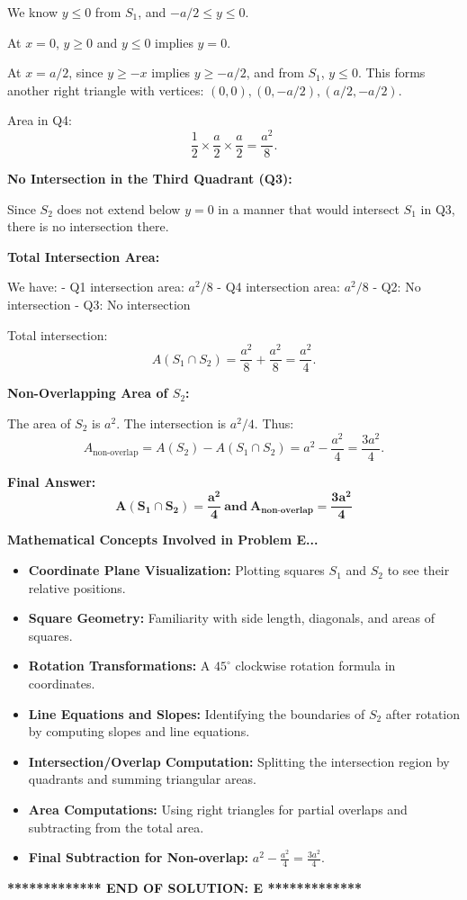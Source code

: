 \documentclass[12pt,a4paper]{article}
\begin{document}
We know \( y \le 0 \) from \( S_1 \), and \(-a/2 \le y \le 0\).

At \( x=0 \), \( y \ge 0 \) and \( y\le 0 \) implies \( y=0 \).

At \( x=a/2 \), since \( y\ge -x \) implies \( y\ge -a/2 \), and from \( S_1 \), \( y \le 0 \). This forms another right triangle with vertices:
\((0,0), (0,-a/2), (a/2,-a/2)\).

Area in Q4:
\[
\frac{1}{2}\times\frac{a}{2}\times\frac{a}{2} = \frac{a^2}{8}.
\]

\medskip

\noindent\textbf{No Intersection in the Third Quadrant (Q3):}

Since \( S_2 \) does not extend below \( y=0 \) in a manner that would intersect \( S_1 \) in Q3, there is no intersection there.

\medskip

\noindent\textbf{Total Intersection Area:}

We have:
- Q1 intersection area: \( a^2/8 \)
- Q4 intersection area: \( a^2/8 \)
- Q2: No intersection
- Q3: No intersection

Total intersection:
\[
A(S_1 \cap S_2) = \frac{a^2}{8} + \frac{a^2}{8} = \frac{a^2}{4}.
\]

\medskip

\noindent\textbf{Non-Overlapping Area of \( S_2 \):}

The area of \( S_2 \) is \( a^2 \). The intersection is \( a^2/4 \). Thus:
\[
A_{\text{non-overlap}} = A(S_2) - A(S_1 \cap S_2) = a^2 - \frac{a^2}{4} = \frac{3a^2}{4}.
\]

\medskip

\noindent\textbf{Final Answer:}
\[
\boxed{\mathbf{A(S_1 \cap S_2) = \frac{a^2}{4}\ \text{and}\ A_{\text{non-overlap}} = \frac{3a^2}{4}}}
\]

\bigskip

\noindent\textbf{Mathematical Concepts Involved in Problem E...}
\begin{itemize}
\item \textbf{Coordinate Plane Visualization:} Plotting squares $S_1$ and $S_2$ to see their relative positions.
\item \textbf{Square Geometry:} Familiarity with side length, diagonals, and areas of squares.
\item \textbf{Rotation Transformations:} A $45^\circ$ clockwise rotation formula in coordinates.
\item \textbf{Line Equations and Slopes:} Identifying the boundaries of $S_2$ after rotation by computing slopes and line equations.
\item \textbf{Intersection/Overlap Computation:} Splitting the intersection region by quadrants and summing triangular areas.
\item \textbf{Area Computations:} Using right triangles for partial overlaps and subtracting from the total area.
\item \textbf{Final Subtraction for Non-overlap:} $a^2 - \frac{a^2}{4} = \frac{3a^2}{4}$.
\end{itemize}

\bigskip
\noindent\hrulefill
\begin{center}
\textbf{************* END OF SOLUTION: E *************}
\end{center}
\hrulefill
\end{document}
